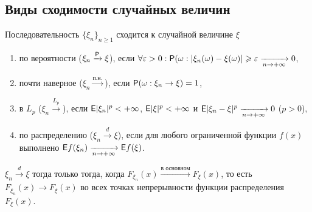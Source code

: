  \subsection*{Виды сходимости случайных величин}
 \begin{definition}
 	Последовательность $\{\xi_n \}_{n \geqslant 1}$ сходится к случайной величине $\xi$
 	\begin{enumerate}
 		\item {по вероятности ($\xi_n \xrightarrow{\P} \xi$), если 
 			$\forall \varepsilon > 0: \P(\omega:|\xi_n(\omega) - \xi(\omega)| 
 			\geqslant \varepsilon \limn 0$,}
 		\item {почти наверное ($\xi_n \xrightarrow{\text{п.н.}}$), если 
 			$\P(\omega: \xi_n \rightarrow \xi) = 1$,}
 		\item {в $L_p$ ($\xi_n \xrightarrow{L_p}$), если $\E |\xi_n |^p < + \infty$, $\E |\xi|^p < +\infty$ и $\E | \xi_n - \xi |^p \limn 0$ ($p > 0$),}
 		\item {по распределению ($\xi_n \xrightarrow{d} \xi$), если для любого
 			 ограниченной функции $f(x)$ выполнено $\E f (\xi_n) \limn \E f(\xi)$.}
 	\end{enumerate}
 \end{definition}
 \begin{theorem}[Александрова][б/д]
 	$\xi_n \xrightarrow{d} \xi$ тогда только тогда, когда 
 	$F_{\xi_n}(x) \xrightarrow{\text{в основном}} F_\xi (x)$, то есть 
 	$F_{\xi_n}(x) \rightarrow F_\xi(x)$ во всех точках непрерывности 
 	функции распределения $F_\xi(x)$. 
 \end{theorem}

